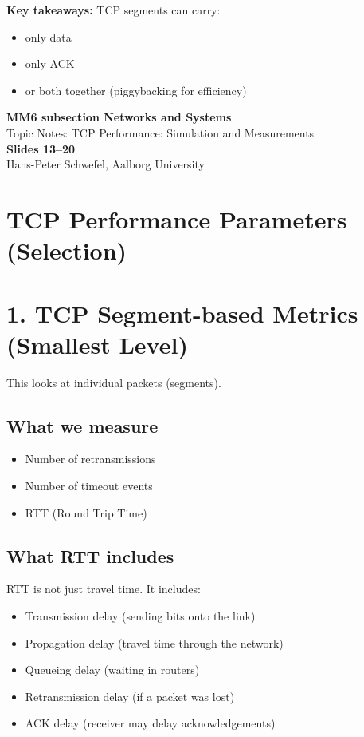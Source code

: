 \begin{notebox}
\textbf{Key takeaways:}
TCP segments can carry:
\begin{itemize}
    \item only data
    \item only ACK
    \item or both together (piggybacking for efficiency)
\end{itemize}
\end{notebox}
\clearpage
\begin{center}
  {\LARGE\bfseries\color{aaublue}
    MM6 subsection Networks and Systems}\\[0.4em]
  {\large\color{accentgray}
    Topic Notes: TCP Performance: Simulation and Measurements}\\[0.2em]
  {\large\bfseries Slides 13--20}\\[0.3em]
  {\small\color{accentgray}
    Hans-Peter Schwefel, Aalborg University}
\end{center}

\section{TCP Performance Parameters (Selection)}

\section{1. TCP Segment-based Metrics (Smallest Level)}

This looks at individual packets (segments).

\subsection*{What we measure}
\begin{itemize}
    \item Number of retransmissions
    \item Number of timeout events
    \item RTT (Round Trip Time)
\end{itemize}

\subsection*{What RTT includes}

RTT is not just travel time. It includes:

\begin{itemize}
    \item Transmission delay (sending bits onto the link)
    \item Propagation delay (travel time through the network)
    \item Queueing delay (waiting in routers)
    \item Retransmission delay (if a packet was lost)
    \item ACK delay (receiver may delay acknowledgements)
\end{itemize}

